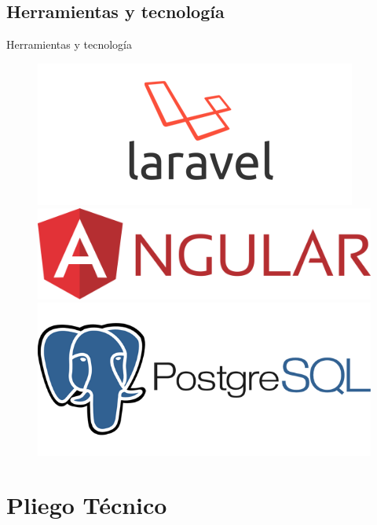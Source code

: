 \documentclass{beamer}
\begin{document}
\subsection{Herramientas y tecnolog\'ia}
\begin{frame}{Herramientas y tecnolog\'ia}
		\begin{figure}[H]
	\centering
	\includegraphics[width=0.35\paperwidth, height=0.3\paperheight]{images_latex/laravel}
	\hspace{0.1cm}
	\includegraphics[width=0.35\paperwidth, height=0.2\paperheight]{images_latex/angular}
	\centering
	\includegraphics[width=0.4\paperwidth, height=0.35\paperheight]{images_latex/postgresql-nombre}
	\end{figure}
	
	\end{frame}

\section{Pliego T\'ecnico}
\end{document}
